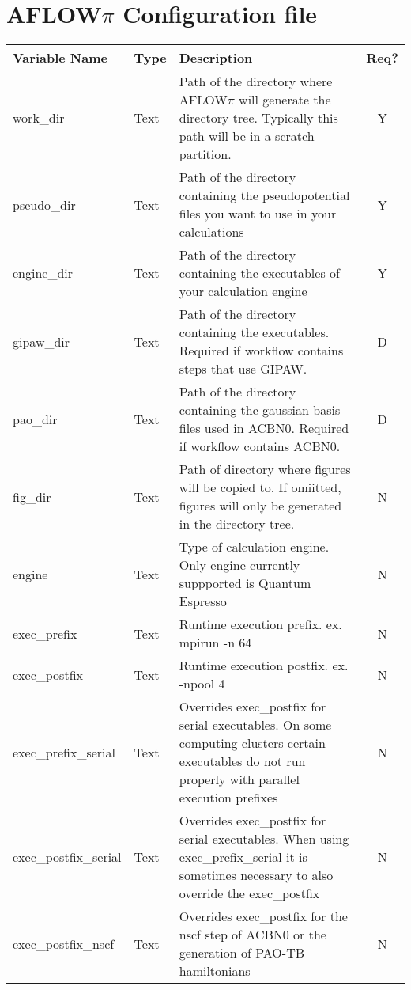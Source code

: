 \documentclass[11pt]{article}
\begin{document}

\section{AFLOW$\pi$ Configuration file}
\begin{center}
\begin{tabular}{|p{3cm}|l|p{9cm}|c|}
\hline
\textbf{Variable Name} & \textbf{Type} & \textbf{Description} & \textbf{Req?}\\
\hline



work\_dir   & Text & Path of the directory where AFLOW$\pi$ will generate the directory tree. Typically this path will be in a scratch partition.& Y\\
\hline
pseudo\_dir & Text & Path of the directory containing the pseudopotential files you want to use in your calculations& Y \\
\hline
engine\_dir & Text & Path of the directory containing the executables of your calculation engine& Y \\
\hline
gipaw\_dir  & Text & Path of the directory containing the executables. Required if workflow contains steps that use GIPAW. & D \\
\hline
pao\_dir    & Text & Path of the directory containing the gaussian basis files used in ACBN0. Required if workflow contains ACBN0.& D\\
\hline
fig\_dir    & Text & Path of directory where figures will be copied to. If omiitted, figures will only be generated in the directory tree.& N\\
\hline
engine                & Text & Type of calculation engine. Only engine currently suppported is Quantum Espresso& N \\
\hline
exec\_prefix          & Text & Runtime execution prefix. ex. mpirun -n 64& N\\
\hline
exec\_postfix         & Text & Runtime execution postfix. ex. -npool 4& N  \\
\hline
exec\_prefix\_serial  & Text & Overrides exec\_postfix for serial executables. On some computing clusters certain executables do not run properly with parallel execution prefixes& N\\
\hline
exec\_postfix\_serial & Text & Overrides exec\_postfix for serial executables. When using exec\_prefix\_serial it is sometimes necessary to also override the exec\_postfix& N \\
\hline
exec\_postfix\_nscf   & Text & Overrides exec\_postfix for the nscf step of ACBN0 or the generation of PAO-TB hamiltonians& N \\
\hline


\end{tabular}
\end{center}
\end{document}
